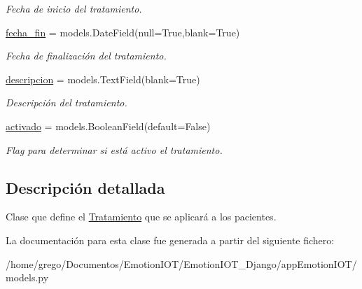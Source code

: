 \begin{DoxyCompactItemize}
\begin{DoxyCompactList}\small\item\em Fecha de inicio del tratamiento. \end{DoxyCompactList}\item 
\hyperlink{classappEmotionIOT_1_1models_1_1Tratamiento_ad17f08db697279cd623a843a7ed19454}{fecha\+\_\+fin} = models.\+Date\+Field(null=True,blank=True)\hypertarget{classappEmotionIOT_1_1models_1_1Tratamiento_ad17f08db697279cd623a843a7ed19454}{}\label{classappEmotionIOT_1_1models_1_1Tratamiento_ad17f08db697279cd623a843a7ed19454}

\begin{DoxyCompactList}\small\item\em Fecha de finalización del tratamiento. \end{DoxyCompactList}\item 
\hyperlink{classappEmotionIOT_1_1models_1_1Tratamiento_a71186a927bbadf97ed4f4d97146e4647}{descripcion} = models.\+Text\+Field(blank=True)\hypertarget{classappEmotionIOT_1_1models_1_1Tratamiento_a71186a927bbadf97ed4f4d97146e4647}{}\label{classappEmotionIOT_1_1models_1_1Tratamiento_a71186a927bbadf97ed4f4d97146e4647}

\begin{DoxyCompactList}\small\item\em Descripción del tratamiento. \end{DoxyCompactList}\item 
\hyperlink{classappEmotionIOT_1_1models_1_1Tratamiento_a217583e61a156e0159bf22f45929c1f3}{activado} = models.\+Boolean\+Field(default=False)\hypertarget{classappEmotionIOT_1_1models_1_1Tratamiento_a217583e61a156e0159bf22f45929c1f3}{}\label{classappEmotionIOT_1_1models_1_1Tratamiento_a217583e61a156e0159bf22f45929c1f3}

\begin{DoxyCompactList}\small\item\em Flag para determinar si está activo el tratamiento. \end{DoxyCompactList}\end{DoxyCompactItemize}


\subsection{Descripción detallada}
Clase que define el \hyperlink{classappEmotionIOT_1_1models_1_1Tratamiento}{Tratamiento} que se aplicará a los pacientes. 

La documentación para esta clase fue generada a partir del siguiente fichero\+:\begin{DoxyCompactItemize}
\item 
/home/grego/\+Documentos/\+Emotion\+I\+O\+T/\+Emotion\+I\+O\+T\+\_\+\+Django/app\+Emotion\+I\+O\+T/models.\+py\end{DoxyCompactItemize}
